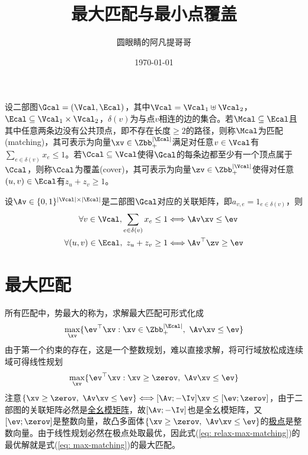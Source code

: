 \documentclass{ctexart}
\begin{document}
\title{最大匹配与最小点覆盖}
\author{圆眼睛的阿凡提哥哥}
\date{\today}
\maketitle

设二部图$\Gcal = (\Vcal, \Ecal)$，其中$\Vcal = \Vcal_1 \uplus \Vcal_2$，$\Ecal \subseteq \Vcal_1 \times \Vcal_2$，$\delta(v)$为与点$v$相连的边的集合。若$\Mcal \subseteq \Ecal$且其中任意两条边没有公共顶点，即不存在长度$\ge 2$的路径，则称$\Mcal$为匹配(matching)，其可表示为向量$\xv \in \Zbb_+^{|\Ecal|}$满足对任意$v \in \Vcal$有$\sum_{e \in \delta(v)} x_e \le 1$。若$\Ccal \subseteq \Vcal$使得$\Gcal$的每条边都至少有一个顶点属于$\Ccal$，则称$\Ccal$为覆盖(cover)，其可表示为向量$\zv \in \Zbb_+^{|\Vcal|}$使得对任意$(u,v) \in \Ecal$有$z_u + z_v \ge 1$。

设$\Av \in \{ 0,1 \}^{|\Vcal| \times |\Ecal|}$是二部图$\Gcal$对应的关联矩阵，即$a_{v,e} = 1_{e \in \delta(v)}$，则
\begin{align*}
    \forall v \in \Vcal, \sum_{e \in \delta(v)} x_e \le 1 & \Longleftrightarrow \Av \xv \le \ev      \\
    \forall (u,v) \in \Ecal, ~ z_u + z_v \ge 1            & \Longleftrightarrow \Av^\top \zv \ge \ev
\end{align*}

\section{最大匹配}

所有匹配中，势最大的称为，求解最大匹配可形式化成
\begin{align} \label{eq: max-matching}
    \max_{\xv} \{ \ev^\top \xv : \xv \in \Zbb_+^{|\Ecal|}, ~ \Av \xv \le \ev \}
\end{align}
由于第一个约束的存在，这是一个整数规划，难以直接求解，将可行域放松成连续域可得线性规划
\begin{align} \label{eq: relax-max-matching}
    \max_{\xv} \{ \ev^\top \xv : \xv \ge \zerov, ~ \Av \xv \le \ev \}
\end{align}
注意$\{ \xv \ge \zerov, ~ \Av \xv \le \ev \} \Longleftrightarrow [\Av; -\Iv] \xv \le [\ev; \zerov]$，由于二部图的关联矩阵必然是\href{https://avanti1980.github.io/notes-on-math/posts/matrix/TU-matrix.html}{全幺模矩阵}，故$[\Av; -\Iv]$也是全幺模矩阵，又$[\ev; \zerov]$是整数向量，故凸多面体$\{ \xv \ge \zerov, ~ \Av \xv \le \ev \}$的\href{https://avanti1980.github.io/notes-on-math/posts/convex-optimization/extreme-point.html}{极点}是整数向量。由于线性规划必然在极点处取最优，因此式(\ref{eq: relax-max-matching})的最优解就是式(\ref{eq: max-matching})的最大匹配。
\end{document}
